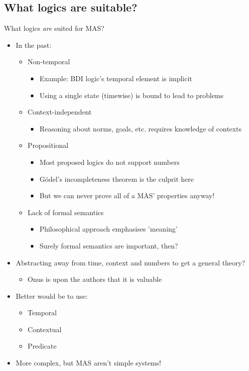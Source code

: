 \documentclass[10pt,a4paper]{beamer}
\begin{document}
\subsection{What logics are suitable?}

\begin{frame}{What logics \emph{are} suited for MAS?}
\begin{itemize}
\item In the past:
\begin{itemize}
\item Non-temporal
\begin{itemize}
\item Example: BDI logic's temporal element is implicit
\item Using a single state (timewise) is bound to lead to problems
\end{itemize}
\item Context-independent
\begin{itemize}
\item Reasoning about norms, goals, etc. requires knowledge of contexts
\end{itemize}
\item Propositional
\begin{itemize}
\item Most proposed logics do not support numbers
\item G\"{o}del’s incompleteness theorem is the culprit here
\item But we can never prove all of a MAS' properties anyway!
\end{itemize}
\item Lack of formal semantics
\begin{itemize}
\item Philosophical approach emphasises 'meaning'
\item Surely formal semantics are important, then?
\end{itemize}
\end{itemize}
\item Abstracting away from time, context and numbers to get a general theory?
\begin{itemize}
\item Onus is upon the authors that it is valuable
\end{itemize}
\item Better would be to use:
\begin{itemize}
\item Temporal
\item Contextual
\item Predicate
\end{itemize}
\item More complex, but MAS aren't simple systems!
\end{itemize}
\end{frame}
\end{document}
